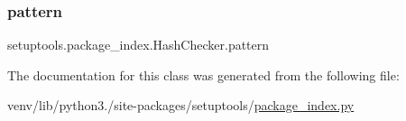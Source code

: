 \mbox{\label{classsetuptools_1_1package__index_1_1HashChecker_addd5cbb7153e31acac4e78f5dcb292d9}} 
\subsubsection{\texorpdfstring{pattern}{pattern}}
{\footnotesize\ttfamily setuptools.\+package\+\_\+index.\+Hash\+Checker.\+pattern\hspace{0.3cm}{\ttfamily [static]}}



The documentation for this class was generated from the following file\+:\begin{DoxyCompactItemize}
\item 
venv/lib/python3./site-\/packages/setuptools/\hyperlink{package__index_8py}{package\+\_\+index.\+py}\end{DoxyCompactItemize}
